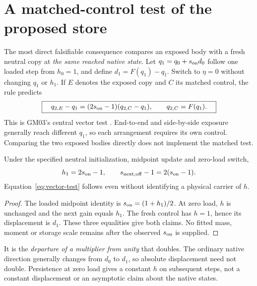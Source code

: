 \section{A matched-control test of the proposed store}\label{sec:test}
The most direct falsifiable consequence compares an exposed body with a fresh neutral copy at \emph{the same reached native state}. Let \(q_1=q_0+s_{\rm on}d_0\) follow one loaded step from \(h_0=1\), and define \(d_1=F(q_1)-q_1\). Switch to \(\eta=0\) without changing \(q_1\) or \(h_1\). If \(E\) denotes the exposed copy and \(C\) its matched control, the rule predicts
\begin{equation}
 \boxed{\quad q_{2,E}-q_1=(2s_{\rm on}-1)(q_{2,C}-q_1),
 \qquad q_{2,C}=F(q_1).\quad}
 \label{eq:vector-test}
\end{equation}
This is GM03's central vector test \cite{GM03}. End-to-end and side-by-side exposure generally reach different \(q_1\), so each arrangement requires its own control. Comparing the two exposed bodies directly does not implement the matched test.

\begin{proposition}\label{prop:off}
Under the specified neutral initialization, midpoint update and zero-load switch,
\begin{equation}
 h_1=2s_{\rm on}-1,\qquad
 s_{\rm next,off}-1=2(s_{\rm on}-1).
 \label{eq:doubling}
\end{equation}
Equation~\eqref{eq:vector-test} follows even without identifying a physical carrier of \(h\).
\end{proposition}
\begin{proof}
The loaded midpoint identity is \(s_{\rm on}=(1+h_1)/2\). At zero load, \(h\) is unchanged and the next gain equals \(h_1\). The fresh control has \(h=1\), hence its displacement is \(d_1\). These three equalities give both claims. No fitted mass, moment or storage scale remains after the observed \(s_{\rm on}\) is supplied.
\end{proof}
It is the \emph{departure of a multiplier from unity} that doubles. The ordinary native direction generally changes from \(d_0\) to \(d_1\), so absolute displacement need not double. Persistence at zero load gives a constant \(h\) on subsequent steps, not a constant displacement or an asymptotic claim about the native states.

